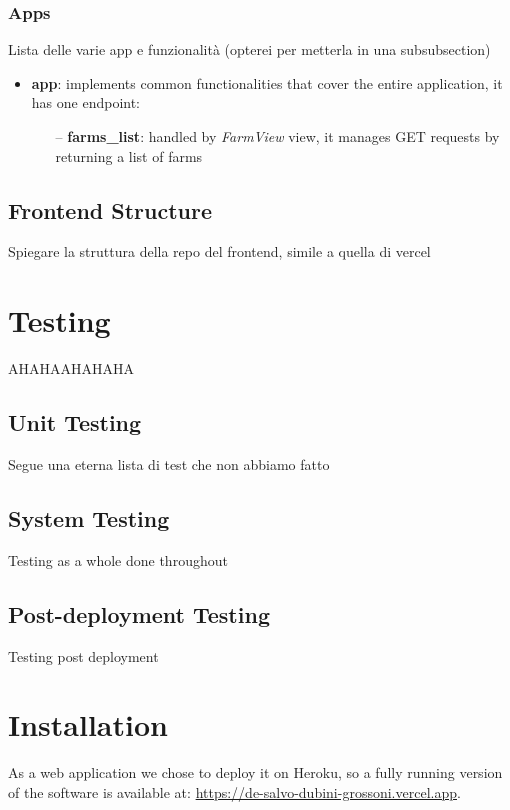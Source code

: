 \documentclass[table, 12pt]{article}
\begin{document}
\subsubsection{Apps}
Lista delle varie app e funzionalità (opterei per metterla in una subsubsection)
\begin{itemize}
    \item \textbf{app}: implements common functionalities that cover the entire application, it has one endpoint:
    \begin{itemize}
        \item[--] \textbf{farms\_list}: handled by \textit{FarmView} view, it manages GET requests by returning a list of farms
    \end{itemize}
\end{itemize}

\subsection{Frontend Structure}
Spiegare la struttura della repo del frontend, simile a quella di vercel


\newpage
\section{Testing}
AHAHAAHAHAHA

\subsection{Unit Testing}
Segue una eterna lista di test che non abbiamo fatto

\subsection{System Testing}
Testing as a whole done throughout

\subsection{Post-deployment Testing}
Testing post deployment

\section{Installation}
As a web application we chose to deploy it on Heroku, so
a fully running version of the software is available at:\newline
\url{https://de-salvo-dubini-grossoni.vercel.app}.
\end{document}
